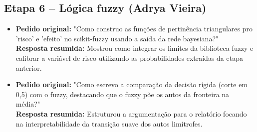 \documentclass[11pt]{article}
\begin{document}
\subsection*{Etapa 6 -- Lógica fuzzy (Adrya Vieira)}
\begin{itemize}
    \item \textbf{Pedido original:} "Como construo as funções de pertinência triangulares pro 'risco' e 'efeito' no scikit-fuzzy usando a saída da rede bayesiana?" \\
    \textbf{Resposta resumida:} Mostrou como integrar os limites da biblioteca fuzzy e calibrar a variável de risco utilizando as probabilidades extraídas da etapa anterior.
    
    \item \textbf{Pedido original:} "Como escrevo a comparação da decisão rígida (corte em 0,5) com o fuzzy, destacando que o fuzzy põe os autos da fronteira na média?" \\
    \textbf{Resposta resumida:} Estruturou a argumentação para o relatório focando na interpretabilidade da transição suave dos autos limítrofes.
\end{itemize}
\end{document}
